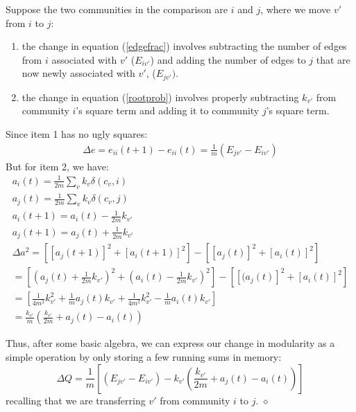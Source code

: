 \documentclass{article}
\begin{document}
Suppose the two communities in the comparison  are $i$ and $j$, 
where we move $v'$ from $i$ to $j$: 
\begin{enumerate}
\item the change in equation (\ref{edgefrac}) involves subtracting
      the number of edges 
      from $i$ associated with $v'$ ($E_{iv'}$) and
      adding the number of edges to $j$ that are now newly associated
      with $v'$, ($E_{jv'})$.
\item the change in equation (\ref{rootprob}) involves properly 
      subtracting $k_{v'}$ from community $i$'s square term and adding it 
      to community $j$'s square term.  
\end{enumerate}
Since item 1 has no ugly squares: 
\begin{eqnarray*}
  \Delta e = e_{ii}(t+1) - e_{ii}(t) = \frac{1}{m}(E_{jv'} - E_{iv'})
\end{eqnarray*} 
But for item 2, we have:
\begin{eqnarray*}
  a_i(t) = \frac{1}{2m}\displaystyle\sum_vk_v\delta(c_v, i)\\
  a_j(t) = \frac{1}{2m}\displaystyle\sum_vk_v\delta(c_v, j)\\
  a_i(t+1) = a_i(t) - \frac{1}{2m}k_{v'}\\
  a_j(t+1) = a_j(t) + \frac{1}{2m}k_{v'}\\
  \Delta a^2 = \left[[a_j(t+1)]^2+[a_i(t+1)]^2\right] - 
              \left[[a_j(t)]^2+[a_i(t)]^2\right]\\
            = \left[\left(a_j(t) + \frac{1}{2m}k_{v'}\right)^2+
                    \left(a_i(t) - \frac{1}{2m}k_{v'}\right)^2\right] -
                    \left[[(a_j(t)]^2+[a_i(t)]^2\right]\\
            = \left[\frac{1}{4m^2}k_{v'}^2+\frac{1}{m}a_j(t)k_{v'} +
                    \frac{1}{4m^2}k_{v'}^2-\frac{1}{m}a_i(t)k_{v'} \right]\\
            = \frac{k_{v'}}{m}
              \left(\frac{k_{v'}}{2m}+a_j(t)-a_i(t)\right)
\end{eqnarray*}

Thus, after some basic algebra, we can express our change in modularity
as a simple operation by only storing a few running sums in memory:
\begin{equation}
  \Delta Q = \frac{1}{m}\left[(E_{jv'} - E_{iv'}) - k_{v'}
             \left(\frac{k_{v'}}{2m}+a_j(t)-a_i(t)\right)\right]
\end{equation}
recalling that we are transferring $v'$ from community $i$ to $j$. 
$\diamond$



\end{document}
